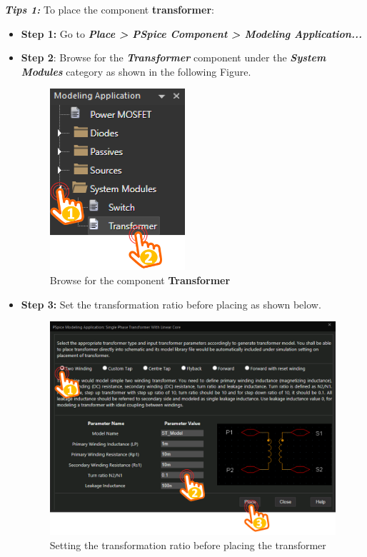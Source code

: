 \textbf{\textit{Tips 1:}}
To place the component \textbf{transformer}:
\begin{itemize}
    \item \textbf{Step 1:} Go to \textbf{\textit{Place > PSpice Component > Modeling Application...}}
    \item \textbf{Step 2}: Browse for the \textbf{\textit{Transformer}} component under the \textbf{\textit{System Modules}} category as shown in the following Figure.
          \begin{figure}[H]
              \centering
              \includegraphics[width=5cm]{source/picture/bai_2/PSpicePlaceTransformer.png}
              \caption{Browse for the component \textbf{Transformer}}
              \label{pspicePlaceTransformer}
          \end{figure}
    \item \textbf{Step 3:} Set the transformation ratio before placing as shown below.
          \begin{figure}[H]
              \centering
              \includegraphics[width=15cm]{source/picture/bai_2/PSpiceTransformerSetting.png}
              \caption{Setting the transformation ratio before placing the transformer}
              \label{pspiceTransformerSetting}
          \end{figure}
\end{itemize}

